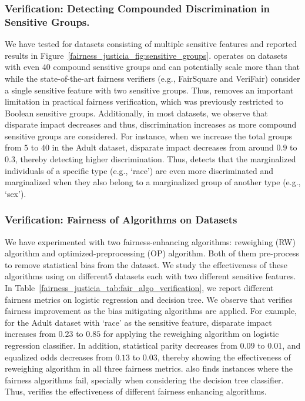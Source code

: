 \subsubsection{Verification: Detecting Compounded Discrimination in Sensitive Groups.}
We have tested {\justicia} for datasets consisting of multiple sensitive features and reported results in Figure~\ref{fairness_justicia_fig:sensitive_groups}. {\justicia} operates on datasets with even 40 compound sensitive groups and can potentially scale more than that while the state-of-the-art fairness verifiers (e.g., FairSquare and VeriFair) consider a single sensitive feature with two sensitive groups. Thus, {\justicia} removes an important limitation in practical fairness verification, which was previously restricted to Boolean sensitive groups. Additionally, in most datasets, we observe that disparate impact decreases and thus, discrimination increases as more compound sensitive groups are considered. For instance, when we increase the total  groups from $ 5 $ to $ 40 $ in the Adult dataset, disparate impact decreases from around $ 0.9 $ to $ 0.3 $, thereby detecting higher discrimination. Thus, {\justicia} detects that the marginalized individuals of a specific type (e.g., `race')  are even more discriminated and marginalized when they also belong to a marginalized group of another type (e.g., `sex').





\subsubsection{Verification: Fairness of Algorithms on Datasets}
We have experimented with two fairness-enhancing algorithms: reweighing (RW) algorithm and optimized-preprocessing (OP) algorithm. Both of them pre-process to remove statistical bias from the dataset. We study the effectiveness of these algorithms using {\justicia} on different5 datasets each with two different sensitive features.  
In Table~\ref{fairness_justicia_tab:fair_algo_verification}, we report different fairness metrics on logistic regression and decision tree. We observe that {\justicia} verifies fairness improvement as the bias mitigating algorithms are applied.  For example, for the Adult dataset with `race' as the sensitive feature, disparate impact increases from $ 0.23 $ to $ 0.85 $ for applying the reweighing algorithm on logistic regression classifier. In addition, statistical parity decreases from $ 0.09 $ to $ 0.01 $, and equalized odds decreases from $ 0.13 $ to $ 0.03 $, thereby showing the effectiveness of reweighing algorithm in all three fairness metrics. 
{\justicia} also finds instances where the fairness algorithms fail, specially when considering the decision tree classifier. 
Thus, {\justicia} verifies the effectiveness of different fairness enhancing algorithms.

